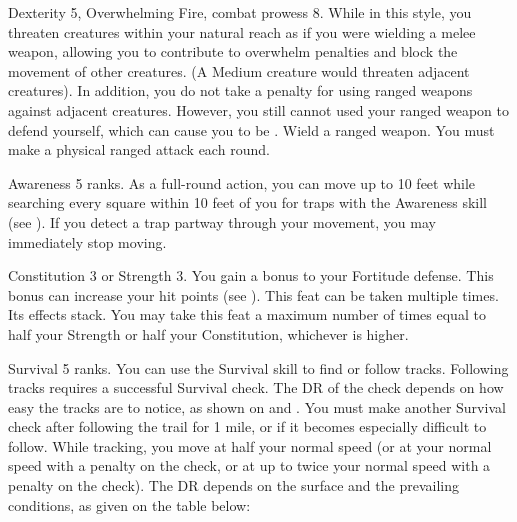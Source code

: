 \featpres Dexterity 5, Overwhelming Fire, combat prowess 8.
\featben While in this style, you threaten creatures within your natural reach as if you were wielding a melee weapon, allowing you to contribute to overwhelm penalties and block the movement of other creatures.
(A Medium creature would threaten adjacent creatures).
In addition, you do not take a  penalty for using ranged weapons against adjacent creatures.
However, you still cannot used your ranged weapon to defend yourself, which can cause you to be .
\stylereq Wield a ranged weapon.
You must make a physical ranged attack each round.

\featpre Awareness 5 ranks.
\featben As a full-round action, you can move up to 10 feet while searching every square within 10 feet of you for traps with the Awareness skill (see ).
If you detect a trap partway through your movement, you may immediately stop moving.

\featpre Constitution 3 or Strength 3.
\featben You gain a  bonus to your Fortitude defense.
This bonus can increase your hit points (see ).
 This feat can be taken multiple times. Its effects stack.
You may take this feat a maximum number of times equal to half your Strength or half your Constitution, whichever is higher.

\featpre Survival 5 ranks.
\featben You can use the Survival skill to find or follow tracks.
Following tracks requires a successful Survival check.
The DR of the check depends on how easy the tracks are to notice, as shown on  and .
You must make another Survival check after following the trail for 1 mile, or if it becomes especially difficult to follow.
While tracking, you move at half your normal speed (or at your normal speed with a  penalty on the check, or at up to twice your normal speed with a  penalty on the check).
The DR depends on the surface and the prevailing conditions, as given on the table below:

